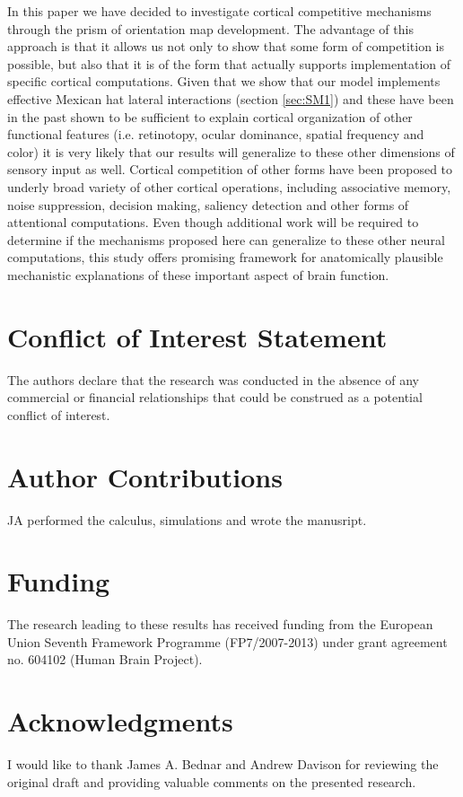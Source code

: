 \documentclass[utf8]{frontiersSCNS}
\begin{document}
In this paper we have decided to investigate cortical competitive mechanisms through the prism of orientation map development. The advantage of this approach is that it allows us not only to show that some form of competition is possible, but also that it is of the form that actually supports implementation of specific cortical computations. 
Given that we show that our model implements effective Mexican hat lateral interactions (section \ref{sec:SM1}) and these have been in the past shown to be sufficient to explain cortical organization of other functional features (i.e. retinotopy, ocular dominance, spatial frequency and color) it is very likely that our results will generalize to these other dimensions of sensory input as well. Cortical competition of other forms have been proposed to underly broad variety of other cortical operations, including associative memory, noise suppression, decision making, saliency detection and other forms of attentional computations. Even though additional work will be required to determine if the mechanisms proposed here can generalize to these other neural computations, this study offers 
promising framework for anatomically plausible mechanistic explanations of these important aspect of brain function.


\section*{Conflict of Interest Statement}

The authors declare that the research was conducted in the absence of any commercial or financial relationships that could be construed as a potential conflict of interest.

\section*{Author Contributions}

JA performed the calculus, simulations and wrote the manusript.

\section*{Funding}
The research leading to these results has received funding from the European Union Seventh Framework Programme (FP7/2007-2013) under grant
agreement no. 604102 (Human Brain Project).

\section*{Acknowledgments}
I would like to thank James A. Bednar and Andrew Davison for reviewing the original draft and 
providing valuable comments on the presented research.




\end{document}
